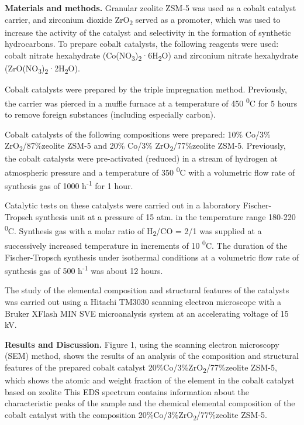 \textbf{Materials and methods.} Granular zeolite ZSM-5 was used as a
cobalt catalyst carrier, and zirconium dioxide ZrO\textsubscript{2}
served as a promoter, which was used to increase the activity of the
catalyst and selectivity in the formation of synthetic hydrocarbons. To
prepare cobalt catalysts, the following reagents were used: cobalt
nitrate hexahydrate
(Co(NO\textsubscript{3})\textsubscript{2}·6H\textsubscript{2}O) and
zirconium nitrate hexahydrate
(ZrO(NO\textsubscript{3})\textsubscript{2}·2H\textsubscript{2}O).

Cobalt catalysts were prepared by the triple impregnation method.
Previously, the carrier was pierced in a muffle furnace at a temperature
of 450 \textsuperscript{0}C for 5 hours to remove foreign substances
(including especially carbon).

Cobalt catalysts of the following compositions were prepared: 10\%
Co/3\% ZrO\textsubscript{2}/87\%zeolite ZSM-5 and 20\% Co/3\%
ZrO\textsubscript{2}/77\%zeolite ZSM-5. Previously, the cobalt catalysts
were pre-activated (reduced) in a stream of hydrogen at atmospheric
pressure and a temperature of 350 \textsuperscript{0}C with a volumetric
flow rate of synthesis gas of 1000 h\textsuperscript{-1} for 1 hour.

Catalytic tests on these catalysts were carried out in a laboratory
Fischer-Tropsch synthesis unit at a pressure of 15 atm. in the
temperature range 180-220 \textsuperscript{0}C. Synthesis gas with a
molar ratio of H\textsubscript{2}/CO = 2/1 was supplied at a
successively increased temperature in increments of 10
\textsuperscript{0}C. The duration of the Fischer-Tropsch synthesis
under isothermal conditions at a volumetric flow rate of synthesis gas
of 500 h\textsuperscript{-1} was about 12 hours.

The study of the elemental composition and structural features of the
catalysts was carried out using a Hitachi TM3030 scanning electron
microscope with a Bruker XFlash MIN SVE microanalysis system at an
accelerating voltage of 15 kV.

\textbf{Results and Discussion.} Figure 1, using the scanning electron
microscopy (SEM) method, shows the results of an analysis of the
composition and structural features of the prepared cobalt catalyst
20\%Co/3\%ZrO\textsubscript{2}/77\%zeolite ZSM-5, which shows the atomic
and weight fraction of the element in the cobalt catalyst based on
zeolite This EDS spectrum contains information about the characteristic
peaks of the sample and the chemical elemental composition of the cobalt
catalyst with the composition 20\%Co/3\%ZrO\textsubscript{2}/77\%zeolite
ZSM-5.


